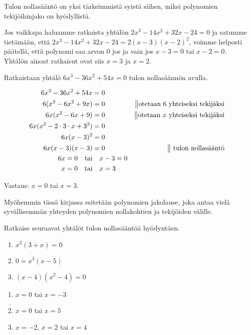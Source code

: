 Tulon nollasääntö on yksi tärkeimmistä syistä siihen, miksi polynomien tekijöihinjako on hyödyllistä.

Jos vaikkapa haluamme ratkaista yhtälön $2x^3-14x^2+32x-24=0$ ja satumme tietämään, että $2x^3-14x^2+32x-24=2(x-3)(x-2)^2$,
voimme helposti päätellä, että polynomi saa arvon $0$ jos ja vain jos $x-3=0$ tai $x-2=0$. Yhtälön ainoat ratkaisut ovat siis $x=3$ ja $x=2$.

\begin{esimerkki}
Ratkaistaan yhtälö $6x^3-36x^2+54x=0$ tulon nollasäännön avulla.

\begin{align*}
6x^3-36x^2+54x &= 0 \\
6(x^3-6x^2+9x) &= 0 \ \ \ \ &\big\| \text{otetaan } 6 \text{ yhteiseksi tekijäksi} \\
6x(x^2-6x+9) &= 0 &\big\| \text{otetaan } x \text{ yhteiseksi tekijäksi} \\
6x(x^2-2\cdot 3\cdot x+3^2)  &= 0 \\
6x(x-3)^2 &= 0 & \\
6x(x-3)(x-3) &= 0 &\big\| \text{ tulon nollasääntö}\\
6x=0 \textrm{\quad tai}& \quad x-3=0 \\
x=0 \textrm{\quad tai}& \quad x=3 \\
\end{align*}

Vastaus: $x=0$ tai $x=3$.
\end{esimerkki}

Myöhemmin tässä kirjassa esitetään polynomien jakolause, joka antaa vielä syvällisemmän yhteyden polynomien nollakohtien ja tekijöiden välille.

\Harjoitustehtavat

\begin{tehtava}
    Ratkaise seuraavat yhtälöt tulon nollasääntöä hyödyntäen.
    \begin{enumerate}
        \item $x^2(3+x)=0$
        \item $0=x^3(x-5)$
        \item $(x-4)(x^2-4)=0$
    \end{enumerate}
    \begin{vastaus}
        \begin{enumerate}
            \item $x=0$ tai $x=-3$
            \item $x=0$ tai $x=5$
            \item $x=-2$, $x=2$ tai $x=4$
        \end{enumerate}
    \end{vastaus}
\end{tehtava}

